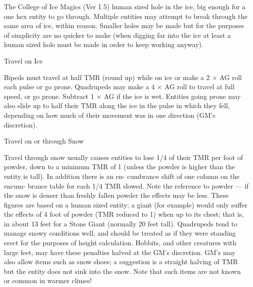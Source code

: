 \begin{Chapter}{The College of Ice Magics (Ver 1.5)}
human  sized  hole  in  the  ice, big  enough  for  a  one 
hex  entity  to  go  through.  Multiple  entities  may 
attempt  to  break  through  the  same  area  of  ice, 
within  reason.  Smaller  holes  may  be  made  but  for 
the  purposes  of  simplicity  are  no  quicker  to  make 
(when  digging  far  into  the  ice  at  least  a  human 
sized hole must be made in order to keep working 
anyway). 

Travel on Ice 

Bipeds  must  travel  at  half  TMR  (round  up)  while 
on  ice  or  make  a  2  ×  AG  roll  each  pulse  or  go 
prone.  Quadrupeds  may  make  a  4  ×  AG  roll  to 
travel at full speed, or go prone. Subtract 1 × AG if 
the  ice  is  wet.  Entities  going  prone may  also  slide 
up to  half  their  TMR  along  the  ice  in  the  pulse  in 
which  they  fell,  depending  on  how  much  of  their 
movement was in one direction (GM’s discretion). 

Travel on or through Snow 

Travel through snow usually causes entities to lose 
1/4  of  their  TMR  per  foot  of  powder,  down  to  a 
minimum  TMR  of  1  (unless  the  powder  is  higher 
than  the  entity  is  tall).  In  addition  there  is  an  en-
cumbrance  shift  of  one  column  on  the  encum-
brance  table  for  each  1/4  TMR  slowed.  Note  the 
reference  to  powder  —  if  the  snow  is  denser  than 
freshly  fallen  powder  the  effects  may  be  less. 
These figures are based on a human sized entity; a 
giant (for example) would only suffer the effects of 
4  foot  of  powder  (TMR  reduced  to  1)  when  up  to 
its chest; that is, in about 13 feet for a Stone Giant 
(normally 20 feet tall). Quadrupeds tend to manage 
snowy  conditions  well,  and  should be  treated  as  if 
they were standing erect for the purposes of height 
calculation. Hobbits, and other creatures with large 
feet,  may  have  these  penalties  halved  at  the  GM’s 
discretion.  GM’s  may  also  allow  items  such  as 
snow  shoes;  a  suggestion  is  a  straight  halving  of 
TMR  but  the  entity  does  not  sink  into  the  snow. 
Note that such items are not known or common in 
warmer climes! 

\end{Chapter}
